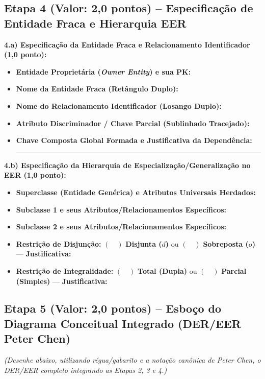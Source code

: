 \documentclass[11pt,a4paper]{article}
\newcommand{\linhaescrita}{\noindent\textcolor{black!40}{\rule{\linewidth}{0.4pt}}\par\vspace{0.28cm}}
\begin{document}
\subsection*{Etapa 4 (Valor: 2,0 pontos) -- Especificação de Entidade Fraca e Hierarquia EER}

\textbf{4.a) Especificação da Entidade Fraca e Relacionamento Identificador (1,0 ponto):}
\begin{itemize}[leftmargin=*, itemsep=4pt, topsep=3pt]
    \item \textbf{Entidade Proprietária (\textit{Owner Entity}) e sua PK:} \dotfill
    \item \textbf{Nome da Entidade Fraca (Retângulo Duplo):} \dotfill
    \item \textbf{Nome do Relacionamento Identificador (Losango Duplo):} \dotfill
    \item \textbf{Atributo Discriminador / Chave Parcial (Sublinhado Tracejado):} \dotfill
    \item \textbf{Chave Composta Global Formada e Justificativa da Dependência:} \\[0.2cm]
    \linhaescrita
\end{itemize}

\vspace{0.1cm}
\noindent\textbf{4.b) Especificação da Hierarquia de Especialização/Generalização no EER (1,0 ponto):}
\begin{itemize}[leftmargin=*, itemsep=4pt, topsep=3pt]
    \item \textbf{Superclasse (Entidade Genérica) e Atributos Universais Herdados:} \dotfill
    \item \textbf{Subclasse 1 e seus Atributos/Relacionamentos Específicos:} \dotfill
    \item \textbf{Subclasse 2 e seus Atributos/Relacionamentos Específicos:} \dotfill
    \item \textbf{Restrição de Disjunção:} $(\quad)$ \textbf{Disjunta ($d$)} \quad ou \quad $(\quad)$ \textbf{Sobreposta ($o$)} --- \textbf{Justificativa:} \dotfill
    \item \textbf{Restrição de Integralidade:} $(\quad)$ \textbf{Total (Dupla)} \quad ou \quad $(\quad)$ \textbf{Parcial (Simples)} --- \textbf{Justificativa:} \dotfill
\end{itemize}

\vspace{0.15cm}
\subsection*{Etapa 5 (Valor: 2,0 pontos) -- Esboço do Diagrama Conceitual Integrado (DER/EER Peter Chen)}
{\footnotesize\textit{(Desenhe abaixo, utilizando régua/gabarito e a notação canônica de Peter Chen, o DER/EER completo integrando as Etapas 2, 3 e 4.)}}
\end{document}
